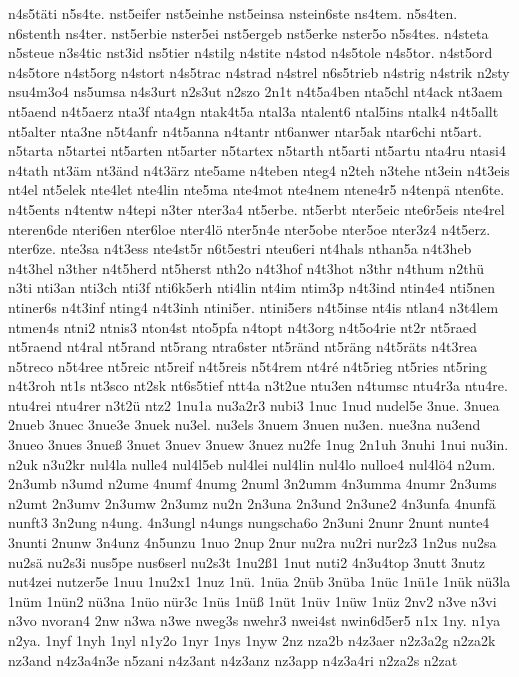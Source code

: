 {n4s5täti
n5s4te.
nst5eifer
nst5einhe
nst5einsa
nstein6ste
ns4tem.
n5s4ten.
n6stenth
ns4ter.
nst5erbie
nster5ei
nst5ergeb
nst5erke
nster5o
n5s4tes.
n4steta
n5steue
n3s4tic
nst3id
ns5tier
n4stilg
n4stite
n4stod
n4s5tole
n4s5tor.
n4st5ord
n4s5tore
n4st5org
n4stort
n4s5trac
n4strad
n4strel
n6s5trieb
n4strig
n4strik
n2sty
nsu4m3o4
ns5umsa
n4s3urt
n2s3ut
n2szo
2n1t
n4t5a4ben
nta5chl
nt4ack
nt3aem
nt5aend
n4t5aerz
nta3f
nta4gn
ntak4t5a
ntal3a
ntalent6
ntal5ins
ntalk4
n4t5allt
nt5alter
nta3ne
n5t4anfr
n4t5anna
n4tantr
nt6anwer
ntar5ak
ntar6chi
nt5art.
n5tarta
n5tartei
nt5arten
nt5arter
n5tartex
n5tarth
nt5arti
nt5artu
nta4ru
ntasi4
n4tath
nt3äm
nt3änd
n4t3ärz
nte5ame
n4teben
nteg4
n2teh
n3tehe
nt3ein
n4t3eis
nt4el
nt5elek
nte4let
nte4lin
nte5ma
nte4mot
nte4nem
ntene4r5
n4tenpä
nten6te.
n4t5ents
n4tentw
n4tepi
n3ter
nter3a4
nt5erbe.
nt5erbt
nter5eic
nte6r5eis
nte4rel
nteren6de
nteri6en
nter6loe
nter4lö
nter5n4e
nter5obe
nter5oe
nter3z4
n4t5erz.
nter6ze.
nte3sa
n4t3ess
nte4st5r
n6t5estri
nteu6eri
nt4hals
nthan5a
n4t3heb
n4t3hel
n3ther
n4t5herd
nt5herst
nth2o
n4t3hof
n4t3hot
n3thr
n4thum
n2thü
n3ti
nti3an
nti3ch
nti3f
nti6k5erh
nti4lin
nt4im
ntim3p
n4t3ind
ntin4e4
nti5nen
ntiner6s
n4t3inf
nting4
n4t3inh
ntini5er.
ntini5ers
n4t5inse
nt4is
ntlan4
n3t4lem
ntmen4s
ntni2
ntnis3
nton4st
nto5pfa
n4topt
n4t3org
n4t5o4rie
nt2r
nt5raed
nt5raend
nt4ral
nt5rand
nt5rang
ntra6ster
nt5ränd
nt5räng
n4t5räts
n4t3rea
n5treco
n5t4ree
nt5reic
nt5reif
n4t5reis
n5t4rem
nt4ré
n4t5rieg
nt5ries
nt5ring
n4t3roh
nt1s
nt3sco
nt2sk
nt6s5tief
ntt4a
n3t2ue
ntu3en
n4tumsc
ntu4r3a
ntu4re.
ntu4rei
ntu4rer
n3t2ü
ntz2
1nu1a
nu3a2r3
nubi3
1nuc
1nud
nudel5e
3nue.
3nuea
2nueb
3nuec
3nue3e
3nuek
nu3el.
nu3els
3nuem
3nuen
nu3en.
nue3na
nu3end
3nueo
3nues
3nueß
3nuet
3nuev
3nuew
3nuez
nu2fe
1nug
2n1uh
3nuhi
1nui
nu3in.
n2uk
n3u2kr
nul4la
nulle4
nul4l5eb
nul4lei
nul4lin
nul4lo
nulloe4
nul4lö4
n2um.
2n3umb
n3umd
n2ume
4numf
4numg
2numl
3n2umm
4n3umma
4numr
2n3ums
n2umt
2n3umv
2n3umw
2n3umz
nu2n
2n3una
2n3und
2n3une2
4n3unfa
4nunfä
nunft3
3n2ung
n4ung.
4n3ungl
n4ungs
nungscha6o
2n3uni
2nunr
2nunt
nunte4
3nunti
2nunw
3n4unz
4n5unzu
1nuo
2nup
2nur
nu2ra
nu2ri
nur2z3
1n2us
nu2sa
nu2sä
nu2s3i
nus5pe
nus6serl
nu2s3t
1nu2ß1
1nut
nuti2
4n3u4top
3nutt
3nutz
nut4zei
nutzer5e
1nuu
1nu2x1
1nuz
1nü.
1nüa
2nüb
3nüba
1nüc
1nü1e
1nük
nü3la
1nüm
1nün2
nü3na
1nüo
nür3c
1nüs
1nüß
1nüt
1nüv
1nüw
1nüz
2nv2
n3ve
n3vi
n3vo
nvoran4
2nw
n3wa
n3we
nweg3s
nwehr3
nwei4st
nwin6d5er5
n1x
1ny.
n1ya
n2ya.
1nyf
1nyh
1nyl
n1y2o
1nyr
1nys
1nyw
2nz
nza2b
n4z3aer
n2z3a2g
n2za2k
nz3and
n4z3a4n3e
n5zani
n4z3ant
n4z3anz
nz3app
n4z3a4ri
n2za2s
n2zat
}
